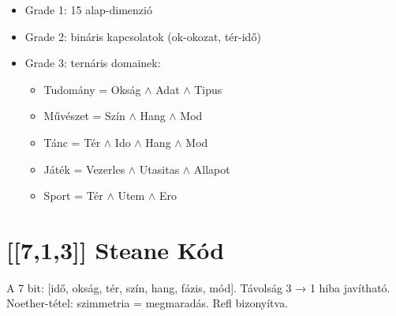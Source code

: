 \documentclass[11pt,a4paper,twocolumn]{article}
\begin{document}
\begin{itemize}
\item Grade 1: 15 alap-dimenzió
\item Grade 2: bináris kapcsolatok (ok-okozat, tér-idő)
\item Grade 3: ternáris domainek:
  \begin{itemize}
  \item Tudomány = Okság $\wedge$ Adat $\wedge$ Tipus
  \item Művészet = Szín $\wedge$ Hang $\wedge$ Mod
  \item Tánc = Tér $\wedge$ Ido $\wedge$ Hang $\wedge$ Mod
  \item Játék = Vezerles $\wedge$ Utasitas $\wedge$ Allapot
  \item Sport = Tér $\wedge$ Utem $\wedge$ Ero
  \end{itemize}
\end{itemize}

\vspace{0.5cm}

\section{[[7,1,3]] Steane Kód}


A 7 bit: [idő, okság, tér, szín, hang, fázis, mód].
Távolság 3 → 1 hiba javítható.
Noether-tétel: szimmetria = megmaradás. Refl bizonyítva.

\vspace{0.5cm}
\end{document}
